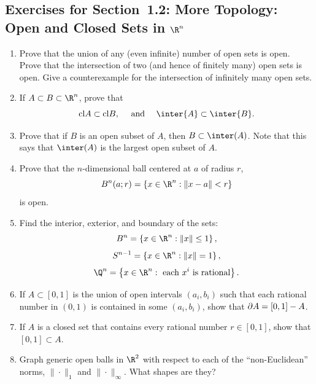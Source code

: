 \documentclass[11pt, a4paper, parskip=full]{scrartcl}
\begin{document}
\subsection*{Exercises for Section~1.2: More Topology: Open and Closed Sets in
$\R^n$}
\begin{enumerate}
\item\label{topology}	Prove that the union of any (even infinite) number of open sets is open.
 Prove that the intersection of two (and hence of finitely many) open sets is
 open.  Give a counterexample for the intersection of infinitely many open sets.

\item\label{clAB}If $A\subset B\subset\R^n$, prove that
	$$\cl{A}\subset\cl{B},\quad\mbox{ and }\quad\inter{A}\subset\inter{B}.$$

\item	Prove that if $B$ is an open subset of $A$, then $B\subset \inter(A)$.  Note that this says that $\inter(A)$ is the largest open subset of $A$.

\item	\label{openset}Prove that the $n$-dimensional ball centered at $a$ of radius $r$,
	$$\ds B^n(a;r) = \left\{x\in\R^n:\|x-a\|< r\right\}$$ is open.

\item	Find the interior, exterior, and boundary of the sets:
	$$B^n = \left\{x\in\R^n : \|x\| \leq 1\right\},$$
	$$S^{n-1} = \left\{x\in\R^n : \|x\| = 1\right\},$$
	$$\Q^n = \left\{x\in\R^n : \mbox{ each } x^i\mbox{ is rational}\right\}.$$
\begin{soln}
\end{soln}


\item	If $A\subset[0,1]$ is the union of open intervals $(a_i,b_i)$ such that
each rational number in $(0,1)$ is contained in some $(a_i,b_i)$, show that
${{\partial}} A = [0,1] - A$.

\item	If $A$ is a closed set that contains every rational number $r\in[0,1]$,
show that $[0,1]\subset A$.

\item	Graph generic open balls in $\R^2$ with respect to each of the ``non-Euclidean'' norms, $\|\cdot\|_1$ and $\|\cdot\|_\infty$.
What shapes are they?
\begin{soln}
\end{soln}

\end{enumerate}
\end{document}
